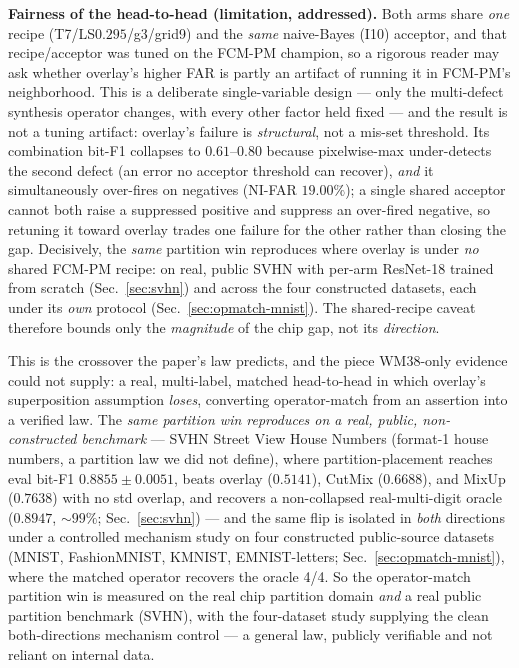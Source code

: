 \documentclass[11pt]{article}
\begin{document}
\textbf{Fairness of the head-to-head (limitation, addressed).} Both arms share \emph{one}
recipe (T7/LS$0.295$/g3/grid9) and the \emph{same} naive-Bayes (I10) acceptor, and that
recipe/acceptor was tuned on the FCM-PM champion, so a rigorous reader may ask whether
overlay's higher FAR is partly an artifact of running it in FCM-PM's neighborhood. This is a
deliberate single-variable design --- only the multi-defect synthesis operator changes, with
every other factor held fixed --- and the result is not a tuning artifact: overlay's failure
is \emph{structural}, not a mis-set threshold. Its combination bit-F1 collapses to
$0.61$--$0.80$ because pixelwise-max under-detects the second defect (an error no acceptor
threshold can recover), \emph{and} it simultaneously over-fires on negatives (NI-FAR
$19.00\%$); a single shared acceptor cannot both raise a suppressed positive and suppress an
over-fired negative, so retuning it toward overlay trades one failure for the other rather
than closing the gap. Decisively, the \emph{same} partition win reproduces where overlay is
under \emph{no} shared FCM-PM recipe: on real, public SVHN with per-arm ResNet-18 trained
from scratch (Sec.~\ref{sec:svhn}) and across the four constructed datasets, each under its
\emph{own} protocol (Sec.~\ref{sec:opmatch-mnist}). The shared-recipe caveat therefore bounds
only the \emph{magnitude} of the chip gap, not its \emph{direction}.

This is the crossover the paper's law predicts, and the piece WM38-only
evidence could not supply: a real, multi-label, matched head-to-head in which overlay's
superposition assumption \emph{loses}, converting operator-match from an assertion into
a verified law. The \emph{same partition win reproduces on a real, public, non-constructed
benchmark} --- SVHN Street View House Numbers (format-1 house numbers, a partition law we
did not define), where partition-placement reaches eval bit-F1 $0.8855 \pm 0.0051$, beats
overlay ($0.5141$), CutMix ($0.6688$), and MixUp ($0.7638$) with no std overlap, and
recovers a non-collapsed real-multi-digit oracle ($0.8947$, ${\sim}99\%$;
Sec.~\ref{sec:svhn}) --- and the same flip is isolated in \emph{both} directions under a
controlled mechanism study on four constructed public-source datasets (MNIST, FashionMNIST,
KMNIST, EMNIST-letters; Sec.~\ref{sec:opmatch-mnist}), where the matched operator recovers
the oracle 4/4. So the operator-match partition win is measured on the real chip partition
domain \emph{and} a real public partition benchmark (SVHN), with the four-dataset study
supplying the clean both-directions mechanism control --- a general law, publicly verifiable
and not reliant on internal data.
\end{document}
